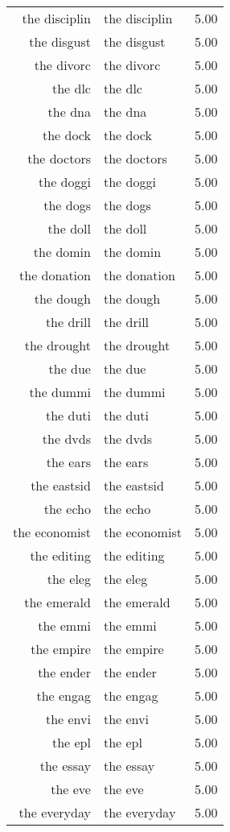 \begin{table}[ht]
\begin{tabular}{rlr}
  the disciplin & the disciplin & 5.00 \\ 
  the disgust & the disgust & 5.00 \\ 
  the divorc & the divorc & 5.00 \\ 
  the dlc & the dlc & 5.00 \\ 
  the dna & the dna & 5.00 \\ 
  the dock & the dock & 5.00 \\ 
  the doctors & the doctors & 5.00 \\ 
  the doggi & the doggi & 5.00 \\ 
  the dogs & the dogs & 5.00 \\ 
  the doll & the doll & 5.00 \\ 
  the domin & the domin & 5.00 \\ 
  the donation & the donation & 5.00 \\ 
  the dough & the dough & 5.00 \\ 
  the drill & the drill & 5.00 \\ 
  the drought & the drought & 5.00 \\ 
  the due & the due & 5.00 \\ 
  the dummi & the dummi & 5.00 \\ 
  the duti & the duti & 5.00 \\ 
  the dvds & the dvds & 5.00 \\ 
  the ears & the ears & 5.00 \\ 
  the eastsid & the eastsid & 5.00 \\ 
  the echo & the echo & 5.00 \\ 
  the economist & the economist & 5.00 \\ 
  the editing & the editing & 5.00 \\ 
  the eleg & the eleg & 5.00 \\ 
  the emerald & the emerald & 5.00 \\ 
  the emmi & the emmi & 5.00 \\ 
  the empire & the empire & 5.00 \\ 
  the ender & the ender & 5.00 \\ 
  the engag & the engag & 5.00 \\ 
  the envi & the envi & 5.00 \\ 
  the epl & the epl & 5.00 \\ 
  the essay & the essay & 5.00 \\ 
  the eve & the eve & 5.00 \\ 
  the everyday & the everyday & 5.00 \\ 

\end{tabular}
\end{table}
